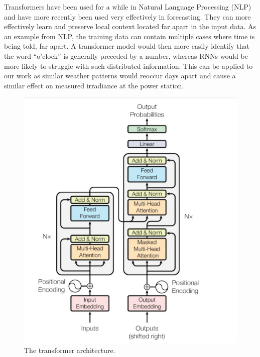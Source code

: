 Transformers have been used for a while in Natural Language Processing (NLP) and have more recently been used very effectively in forecasting.\cite{vaswani_attention_2017} They can more effectively learn and preserve local context located far apart in the input data. As an example from NLP, the training data can contain multiple cases where time is being told, far apart. A transformer model would then more easily identify that the word “o’clock” is generally preceded by a number, whereas RNNs would be more likely to struggle with such distributed information. This can be applied to our work as similar weather patterns would reoccur days apart and cause a similar effect on measured irradiance at the power station.

\begin{figure}[ht!]
    \centering
    \includegraphics[scale=0.95]{imgs/transformer.png}
    \caption{The transformer architecture.\cite{vaswani_attention_2017}
    \label{fig:transformer}}
\end{figure}



